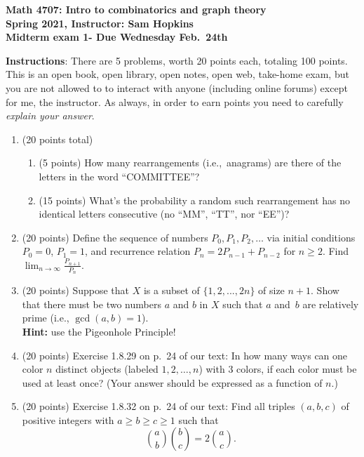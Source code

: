 \documentclass[11pt]{article}
\begin{document}
\thispagestyle{empty}

\begin{center}
{\bf Math 4707: Intro to combinatorics and graph theory \\
Spring 2021, Instructor: Sam Hopkins \\
Midterm exam 1- Due Wednesday Feb.~24th}
\end{center}

{\bf Instructions}: There are 5 problems, worth 20 points each, totaling 100 points. This is an open book, open library, open notes, open web, take-home exam, but you are not allowed to to interact with anyone (including online forums) except for me, the instructor. As always, in order to earn points you need to carefully \emph{explain your answer}.

\begin{enumerate}

\item (20 points total) \begin{enumerate}
\item (5 points) How many rearrangements (i.e.,~anagrams) are there of the letters in the word ``COMMITTEE''?
\item (15 points) What's the probability a random such rearrangement has no identical letters consecutive (no ``MM'', ``TT'', nor ``EE'')?

\end{enumerate}

\item (20 points) Define the sequence of numbers $P_0,P_1,P_2,\ldots$ via initial conditions $P_0 = 0$, $P_1 =1$, and recurrence relation $P_{n}=2P_{n-1}+P_{n-2}$ for $n\geq 2$. Find $\displaystyle \lim_{n \to \infty} \frac{P_{n+1}}{P_{n}}$.

\item (20 points) Suppose that $X$ is a subset of $\{1,2,...,2n\}$ of size $n+1$. Show that there must be two numbers $a$ and $b$ in $X$ such that $a$ and~$b$ are relatively prime (i.e., $\gcd(a,b)=1$). \\ {\bf Hint:} use the Pigeonhole Principle!

\item (20 points) Exercise 1.8.29 on p.~24 of our text: In how many ways can one color $n$ distinct objects (labeled $1,2,\ldots,n$) with $3$ colors, if each color must be used at least once? (Your answer should be expressed as a function of $n$.)

\item (20 points) Exercise 1.8.32 on p.~24 of our text: Find all triples $(a,b,c)$ of positive integers with $a \geq b \geq c \geq 1$ such that
\[\binom{a}{b}\binom{b}{c} = 2\binom{a}{c}.\]

\end{enumerate}
\end{document}
